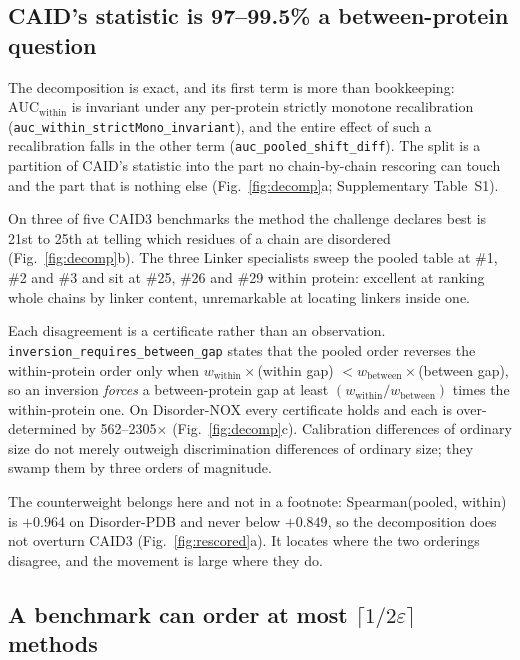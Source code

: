 \documentclass[11pt,a4paper]{article}
\newcommand{\eps}{\varepsilon}
\newcommand{\code}[1]{\texttt{\small #1}}
\begin{document}
\subsection*{CAID's statistic is 97--99.5\% a between-protein question}

The decomposition is exact, and its first term is more than bookkeeping:
$\mathrm{AUC}_{\text{within}}$ is invariant under any per-protein strictly
monotone recalibration (\code{auc\_within\_strictMono\_invariant}), and the
entire effect of such a recalibration falls in the other term
(\code{auc\_pooled\_shift\_diff}). The split is a partition of CAID's statistic
into the part no chain-by-chain rescoring can touch and the part that is nothing
else (Fig.~\ref{fig:decomp}a; Supplementary Table~S1).

On three of five CAID3 benchmarks the method the challenge declares best is
21st to 25th at telling which residues of a chain are disordered
(Fig.~\ref{fig:decomp}b). The three Linker specialists sweep the pooled table at
\#1, \#2 and \#3 and sit at \#25, \#26 and \#29 within protein: excellent at
ranking whole chains by linker content, unremarkable at locating linkers inside
one.

Each disagreement is a certificate rather than an observation.
\code{inversion\_requires\_between\_gap} states that the pooled order reverses
the within-protein order only when $w_{\text{within}}\times$(within gap)
$< w_{\text{between}}\times$(between gap), so an inversion \emph{forces} a
between-protein gap at least $(w_{\text{within}}/w_{\text{between}})$ times the
within-protein one. On Disorder-NOX every certificate holds and each is
over-determined by 562--2305$\times$ (Fig.~\ref{fig:decomp}c). Calibration
differences of ordinary size do not merely outweigh discrimination differences
of ordinary size; they swamp them by three orders of magnitude.

The counterweight belongs here and not in a footnote: Spearman(pooled, within)
is $+0.964$ on Disorder-PDB and never below $+0.849$, so the decomposition does
not overturn CAID3 (Fig.~\ref{fig:rescored}a). It locates where the two
orderings disagree, and the movement is large where they do.

\subsection*{A benchmark can order at most $\lceil 1/2\eps\rceil$ methods}
\end{document}
